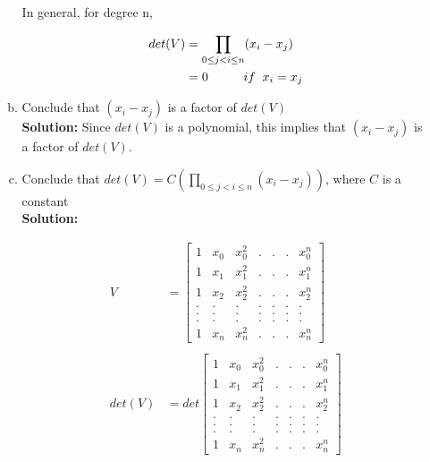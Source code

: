 \documentclass{article}
\begin{document}
\begin{enumerate}
\begin{enumerate}[(a)]
        In general, for degree n,

        \begin{align*}
            det(V) &= \displaystyle \prod_{0 \leq j < i \leq n} (x_{i} - x_{j}) \\
            &= 0 \hspace{1cm} if \hspace{0.2cm} x_{i} = x_{j}
        \end{align*}



\item Conclude that $(x_{i} - x_{j})$ is a factor of $det(V)$ \\

\textbf{Solution:}
Since $det(V)$ is a polynomial, this implies that $(x_{i} - x_{j})$ is a factor of $det(V)$.


\item Conclude that $det(V) = C \left(\displaystyle \prod_{0 \leq j < i \leq n} (x_{i} - x_{j}) \right)$, where $C$ is a constant \\

\textbf{Solution:}

    \begin{align*}
    V &= \begin{bmatrix}
        1 & x_{0} & x_{0}^{2} & . & . & . & x_{0}^{n}\\
        1 & x_{1} & x_{1}^{2} & . & . & . & x_{1}^{n}\\
        1 & x_{2} & x_{2}^{2} & . & . & . & x_{2}^{n}\\
        . & .     & .         & . & . & . & . \\
        . & .     & .         & . & . & . & . \\
        . & .     & .         & . & . & . & . \\
        1 & x_{n} & x_{n}^{2} & . & . & . & x_{n}^{n} 
    \end{bmatrix} \\ \\
    det(V) &= det \begin{bmatrix}
        1 & x_{0} & x_{0}^{2} & . & . & . & x_{0}^{n}\\
        1 & x_{1} & x_{1}^{2} & . & . & . & x_{1}^{n}\\
        1 & x_{2} & x_{2}^{2} & . & . & . & x_{2}^{n}\\
        . & .     & .         & . & . & . & . \\
        . & .     & .         & . & . & . & . \\
        . & .     & .         & . & . & . & . \\
        1 & x_{n} & x_{n}^{2} & . & . & . & x_{n}^{n} 
    \end{bmatrix}
    \end{align*}


\end{enumerate}
\end{enumerate}
\end{document}
